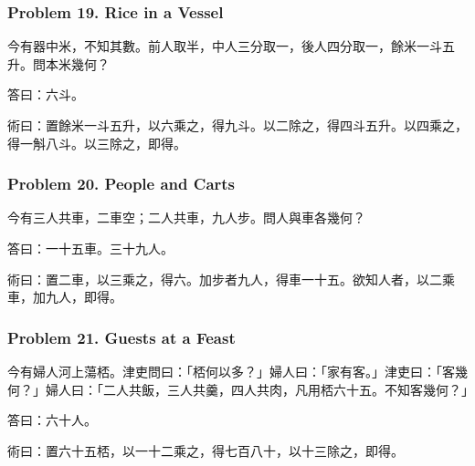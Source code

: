 \documentclass[11pt,a4paper]{article}
\newcommand{\zh}[1]{{\CJKfamily{}#1}}
\begin{document}
\subsubsection*{Problem 19. Rice in a Vessel}

\begin{problembox}[title=\zh{問}]
\zh{今有器中米，不知其數。前人取半，中人三分取一，後人四分取一，餘米一斗五升。問本米幾何？}
\end{problembox}
\begin{answerbox}[title=\zh{答}]
\zh{答曰：六斗。}
\end{answerbox}
\begin{methodbox}[title=\zh{術}]
\zh{術曰：置餘米一斗五升，以六乘之，得九斗。以二除之，得四斗五升。以四乘之，得一斛八斗。以三除之，即得。}
\end{methodbox}

\subsubsection*{Problem 20. People and Carts}

\begin{problembox}[title=\zh{問}]
\zh{今有三人共車，二車空；二人共車，九人步。問人與車各幾何？}
\end{problembox}
\begin{answerbox}[title=\zh{答}]
\zh{答曰：一十五車。三十九人。}
\end{answerbox}
\begin{methodbox}[title=\zh{術}]
\zh{術曰：置二車，以三乘之，得六。加步者九人，得車一十五。欲知人者，以二乘車，加九人，即得。}
\end{methodbox}

\subsubsection*{Problem 21. Guests at a Feast}

\begin{problembox}[title=\zh{問}]
\zh{今有婦人河上蕩桮。津吏問曰：「桮何以多？」婦人曰：「家有客。」津吏曰：「客幾何？」婦人曰：「二人共飯，三人共羹，四人共肉，凡用桮六十五。不知客幾何？」}
\end{problembox}
\begin{answerbox}[title=\zh{答}]
\zh{答曰：六十人。}
\end{answerbox}
\begin{methodbox}[title=\zh{術}]
\zh{術曰：置六十五桮，以一十二乘之，得七百八十，以十三除之，即得。}
\end{methodbox}
\end{document}
